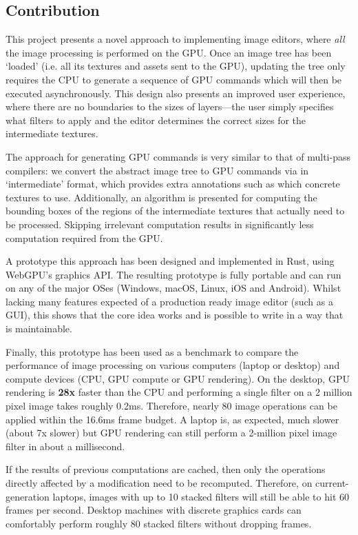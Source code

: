 \documentclass[12pt]{article}
\begin{document}
\subsection{Contribution}

This project presents a novel approach to implementing image editors, where \emph{all} the image
processing is performed on the GPU.  Once an image tree has been `loaded' (i.e. all its textures and
assets sent to the GPU), updating the tree only requires the CPU to generate a sequence of GPU
commands which will then be executed asynchronously.  This design also presents an improved user
experience, where there are no boundaries to the sizes of layers---the user simply specifies what
filters to apply and the editor determines the correct sizes for the intermediate textures.

The approach for generating GPU commands is very similar to that of multi-pass compilers: we convert
the abstract image tree to GPU commands via in `intermediate' format, which provides extra
annotations such as which concrete textures to use.  Additionally, an algorithm is presented for
computing the bounding boxes of the regions of the intermediate textures that actually need to be
processed.  Skipping irrelevant computation results in significantly less computation required from
the GPU.

A prototype this approach has been designed and implemented in Rust, using WebGPU's graphics API.
The resulting prototype is fully portable and can run on any of the major OSes (Windows, macOS,
Linux, iOS and Android).  Whilst lacking many features expected of a production ready image editor
(such as a GUI), this shows that the core idea works and is possible to write in a way that is
maintainable.

Finally, this prototype has been used as a benchmark to compare the performance of image processing
on various computers (laptop or desktop) and compute devices (CPU, GPU compute or GPU rendering).
On the desktop, GPU rendering is \textbf{28x} faster than the CPU and performing a single filter on
a 2 million pixel image takes roughly 0.2ms.  Therefore, nearly 80 image operations can be applied
within the 16.6ms frame budget.  A laptop is, as expected, much slower (about 7x slower) but GPU
rendering can still perform a 2-million pixel image filter in about a millisecond.

If the results of previous computations are cached, then only the operations directly affected by a
modification need to be recomputed.  Therefore, on current-generation laptops, images with up to 10
stacked filters will still be able to hit 60 frames per second.  Desktop machines with discrete
graphics cards can comfortably perform roughly 80 stacked filters without dropping frames.
\end{document}
